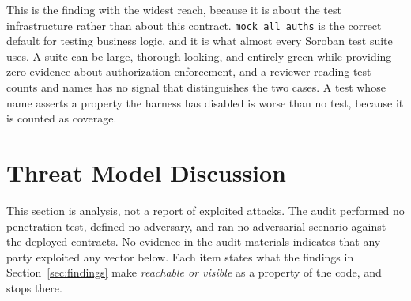 \documentclass[sigconf,review]{acmart}
\begin{document}
This is the finding with the widest reach, because it is about the test
infrastructure rather than about this contract. \texttt{mock\_all\_auths} is
the correct default for testing business logic, and it is what almost every
Soroban test suite uses. A suite can be large, thorough-looking, and entirely
green while providing zero evidence about authorization enforcement, and a
reviewer reading test counts and names has no signal that distinguishes the two
cases. A test whose name asserts a property the harness has disabled is worse
than no test, because it is counted as coverage.




\section{Threat Model Discussion}
\label{sec:threat}

This section is analysis, not a report of exploited attacks. The audit
performed no penetration test, defined no adversary, and ran no adversarial
scenario against the deployed contracts. No evidence in the audit materials
indicates that any party exploited any vector below. Each item states what the
findings in Section~\ref{sec:findings} make \emph{reachable or visible} as a
property of the code, and stops there.
\end{document}
